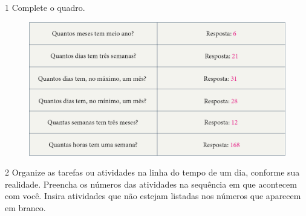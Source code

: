 \pagebreak
{}


\num{1} Complete o quadro.

\begin{figure}[htpb!]
\centering
\includegraphics[width=.9\textwidth]{./media/image50.png}
\end{figure}

\pagebreak
\num{2} Organize as tarefas ou atividades na linha do tempo de um dia, conforme
sua realidade. Preencha os números das atividades na sequência em que acontecem com você. Insira atividades que não estejam listadas nos números que aparecem em branco.

